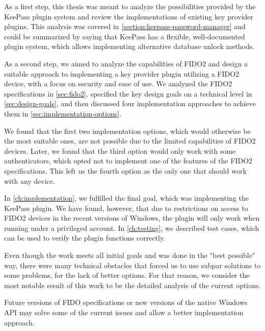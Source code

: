 As a first step, this thesis was meant to analyze the possibilities provided by the
KeePass plugin system and review the implementations of existing key provider plugins. This
analysis was covered in \autoref{section:keepass-password-manager} and could be summarized by
saying that KeePass has a flexible, well-documented plugin system, which allows implementing
alternative database unlock methods.

As a second step, we aimed to analyze the capabilities of FIDO2 and design a suitable approach
to implementing a key provider plugin utilizing a FIDO2 device, with a focus on security and ease of use.
We analyzed the FIDO2 specifications in \autoref{sec:fido2}, specified the key design goals on
a technical level in \autoref{sec:design-goals}, and then discussed four implementation approaches
to achieve them in \autoref{sec:implementation-options}.

We found that the first two implementation options, which would otherwise be the most suitable ones,
are not possible due to the limited capabilities of FIDO2 devices. Later, we found that the
third option would only work with some authenticators, which opted not to implement one of
the features of the FIDO2 specifications. This left us the fourth option as the only one
that should work with any device.

In \autoref{ch:implementation}, we fulfilled the final goal, which was implementing
the KeePass plugin. We have found, however, that due to restrictions on access to FIDO2
devices in the recent versions of Windows, the plugin will only work when running
under a privileged account. In \autoref{ch:testing}, we described test cases,
which can be used to verify the plugin functions correctly.

Even though the work meets all initial goals and was done in the "best possible" way,
there were many technical obstacles that forced us to use subpar solutions to some
problems, for the lack of better options. For that reason, we consider the most
notable result of this work to be the detailed analysis of the current options.

Future versions of FIDO specifications or new versions of the native Windows API may solve
some of the current issues and allow a better implementation approach.
